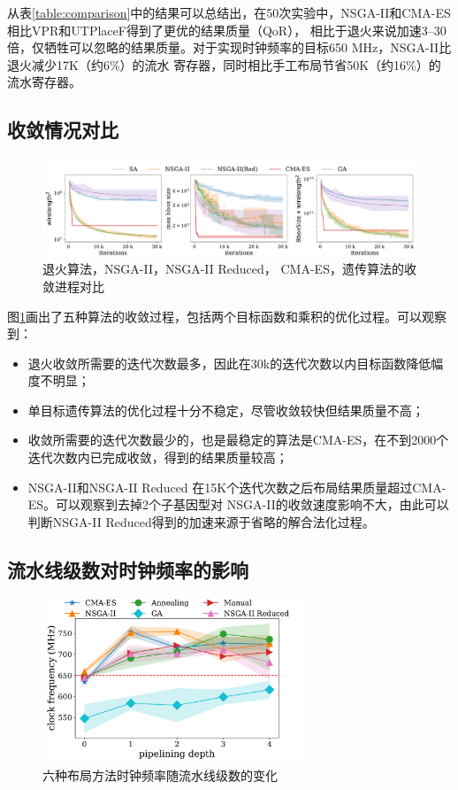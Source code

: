 从表\ref{table:comparison}中的结果可以总结出，在50次实验中，NSGA-II和CMA-ES相比VPR和UTPlaceF得到了更优的结果质量（QoR），
相比于退火来说加速3--30倍，仅牺牲可以忽略的结果质量。对于实现时钟频率的目标650 MHz，NSGA-II比退火减少17K（约6\%）的流水
寄存器，同时相比手工布局节省50K（约16\%）的流水寄存器。


\subsection{收敛情况对比}

\begin{figure}[h]
    \hspace*{-1cm}
	\centering
	\includegraphics[width=1.1\textwidth]{figure/convergence}
	\caption{退火算法，NSGA-II，NSGA-II Reduced， CMA-ES，遗传算法的收敛进程对比} 
	\label{fig:converge}
\end{figure}

图\ref{fig:converge}画出了五种算法的收敛过程，包括两个目标函数和乘积的优化过程。可以观察到：
\begin{itemize}
    \item 退火收敛所需要的迭代次数最多，因此在30k的迭代次数以内目标函数降低幅度不明显；
    \item 单目标遗传算法的优化过程十分不稳定，尽管收敛较快但结果质量不高；
    \item 收敛所需要的迭代次数最少的，也是最稳定的算法是CMA-ES，在不到2000个迭代次数内已完成收敛，得到的结果质量较高；
    \item NSGA-II和NSGA-II Reduced 在15K个迭代次数之后布局结果质量超过CMA-ES。可以观察到去掉2个子基因型对
    NSGA-II的收敛速度影响不大，由此可以判断NSGA-II Reduced得到的加速来源于省略的解合法化过程。
\end{itemize}


\subsection{流水线级数对时钟频率的影响}

\begin{figure}[h]
	\centering
	\includegraphics[width=0.7\textwidth]{figure/frequency_depth}
	\caption{六种布局方法时钟频率随流水线级数的变化} 
	\label{fig:freq_depth}
\end{figure}

